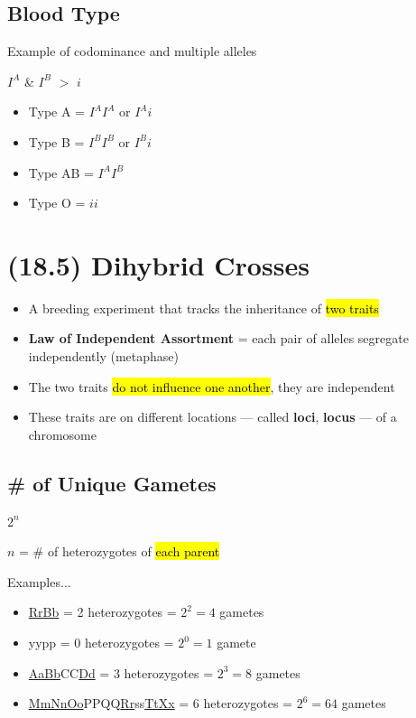\documentclass[a4paper,12pt]{article}
\begin{document}
\subsection{Blood Type}
Example of codominance and multiple alleles

$I^A$ \& $I^B$ $>$ $i$
\begin{itemize}
    \item{Type A = $I^AI^A$ or $I^Ai$}
    \item{Type B = $I^BI^B$ or $I^Bi$}
    \item{Type AB = $I^AI^B$}
    \item{Type O = $ii$}
\end{itemize}

\pagebreak

\section{(18.5) Dihybrid Crosses}
\begin{itemize}
    \item{A breeding experiment that tracks the inheritance of \hl{two traits}}
    \item{\textbf{Law of Independent Assortment} = each pair of alleles segregate independently (metaphase)}
    \item{The two traits \hl{do not influence one another}, they are independent}
    \item{These traits are on different locations --- called \textbf{loci}, \textbf{locus} --- of a chromosome}
\end{itemize}

\subsection{\# of Unique Gametes}\noindent

\begin{center}
\Huge $2^n$ \normalsize

$n$ = \# of heterozygotes of \hl{each parent}
\end{center}

Examples...
\begin{itemize}
    \item{\underline{RrBb} = 2 heterozygotes = $2^2 = 4$ gametes}
    \item{yypp = 0 heterozygotes = $2^0 = 1$ gamete}
    \item{\underline{AaBb}CC\underline{Dd} = 3 heterozygotes = $2^3 = 8$ gametes}
    \item{\underline{MmNnOo}PPQQ\underline{Rr}ss\underline{TtXx} = 6 heterozygotes = $2^6 = 64$ gametes}
\end{itemize}
\end{document}
